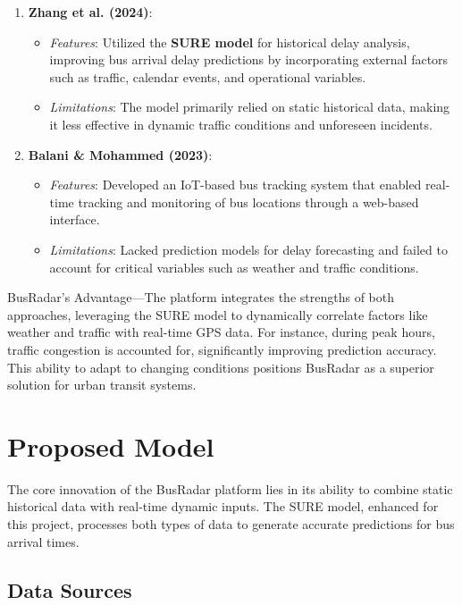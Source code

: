 \documentclass[conference]{IEEEtran}
\begin{document}
\begin{enumerate}
    \item \textbf{Zhang et al. (2024)}:
    \begin{itemize}
        \item \textit{Features}: Utilized the \textbf{SURE model} for historical delay analysis, improving bus arrival delay predictions by incorporating external factors such as traffic, calendar events, and operational variables.
        \item \textit{Limitations}: The model primarily relied on static historical data, making it less effective in dynamic traffic conditions and unforeseen incidents.
    \end{itemize}

    \item \textbf{Balani \& Mohammed (2023)}:
    \begin{itemize}
        \item \textit{Features}: Developed an IoT-based bus tracking system that enabled real-time tracking and monitoring of bus locations through a web-based interface.
        \item \textit{Limitations}: Lacked prediction models for delay forecasting and failed to account for critical variables such as weather and traffic conditions.
    \end{itemize}
\end{enumerate}


BusRadar’s Advantage—The platform integrates the strengths of both approaches, leveraging the SURE model to dynamically correlate factors like weather and traffic with real-time GPS data. For instance, during peak hours, traffic congestion is accounted for, significantly improving prediction accuracy. This ability to adapt to changing conditions positions BusRadar as a superior solution for urban transit systems. 

\section{Proposed Model}
The core innovation of the BusRadar platform lies in its ability to combine static historical data with real-time dynamic inputs. The SURE model, enhanced for this project, processes both types of data to generate accurate predictions for bus arrival times. 

\subsection{Data Sources}
\end{document}
